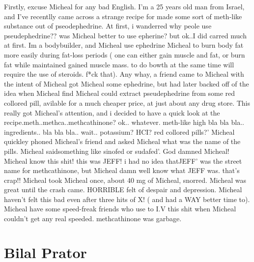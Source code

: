 \documentclass[12pt]{book}
\begin{document}
Firstly, excuse Micheal for any bad English. I'm a 25 years old man from Israel, and I've recentlly came across a strange recipe for made some sort of meth-like substance out of pseodephedrine. At first, i wanderred why peole use pseudephedrine?? was Micheal better to use epherine? but ok..I did carred much at first. Im a bodybuilder, and Micheal use ephedrine Micheal to burn body fat more easily during fat-loss periods ( one can either gain muscle and fat, or burn fat while maintained gained muscle mass. to do bowth at the same time will require the use of steroids. f*ck that). Any whay, a friend came to Micheal with the intent of Micheal got Micheal some ephedrine, but had later backed off of the idea when Micheal find Micheal could extract pseudephedrine from some red collored pill, avilable for a much cheaper price, at just about any drug store. This really got Micheal's attention, and i decided to have a quick look at the recipe.meth..methca..methcathinone? ok.. whatever. meth-like high bla bla bla.. ingredients.. bla bla bla.. wait.. potassium? HCI? red collored pills?' Micheal quickley phoned Micheal's friend and asked Micheal what was the name of the pills. Micheal saidsomething like sinofed or sudafed'. God damned Micheal! Micheal know this shit! this was JEFF! i had no idea thatJEFF' was the street name for methcathinone, but Micheal damn well know what JEFF was. that's crap!! Micheal took Micheal once, about 40 mg of Micheal, snorred. Micheal was great until the crash came. HORRIBLE felt of despair and depression. Micheal haven't felt this bad even after three hits of X! ( and had a WAY better time to). Micheal have some speed-freak friends who use to I.V this shit when Micheal couldn't get any real speeded. methcathinone was garbage.



\chapter{Bilal Prator}
\end{document}
